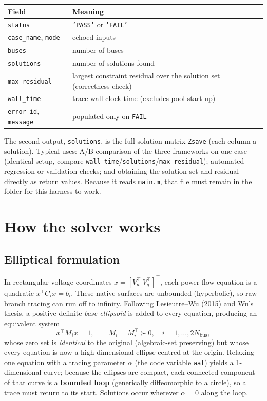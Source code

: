 \documentclass[11pt,a4paper]{article}
\newcommand{\code}[1]{\texttt{#1}}
\begin{document}
\begin{center}\small
\begin{tabular}{@{}ll@{}}
\toprule
Field & Meaning\\
\midrule
\code{status} & \code{'PASS'} or \code{'FAIL'}\\
\code{case_name}, \code{mode} & echoed inputs\\
\code{buses} & number of buses\\
\code{solutions} & number of solutions found\\
\code{max_residual} & largest constraint residual over the solution set (correctness check)\\
\code{wall_time} & trace wall-clock time (excludes pool start-up)\\
\code{error_id}, \code{message} & populated only on \code{FAIL}\\
\bottomrule
\end{tabular}
\end{center}
The second output, \code{solutions}, is the full solution matrix \code{Zsave} (each column
a solution). Typical uses: A/B comparison of the three frameworks on one case (identical
setup, compare \code{wall_time}/\code{solutions}/\code{max_residual}); automated
regression or validation checks; and obtaining the solution set and residual directly as
return values. Because it reads \code{main.m}, that file must remain in the folder for
this harness to work.

\section{How the solver works}

\subsection{Elliptical formulation}
In rectangular voltage coordinates $x=[V_d^\top\ V_q^\top]^\top$, each power-flow
equation is a quadratic $x^\top C_i x = b_i$. These native surfaces are unbounded
(hyperbolic), so raw branch tracing can run off to infinity. Following
Lesieutre--Wu (2015) and Wu's thesis, a positive-definite \emph{base
ellipsoid} is added to every equation, producing an equivalent system
\[
  x^\top M_i x = 1, \qquad M_i = M_i^\top \succ 0, \quad i=1,\dots,2N_{\text{bus}},
\]
whose zero set is \emph{identical} to the original (algebraic-set preserving) but whose
every equation is now a high-dimensional ellipse centred at the origin. Relaxing one
equation with a tracing parameter $\alpha$ (the code variable \code{aal}) yields a
1-dimensional curve; because the ellipses are compact, each connected component of that
curve is a \textbf{bounded loop} (generically diffeomorphic to a circle), so a trace must
return to its start. Solutions occur wherever $\alpha=0$ along the loop.
\end{document}
